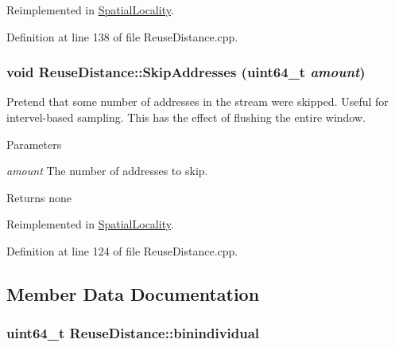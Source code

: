 Reimplemented in \hyperlink{class_spatial_locality_a72a96a67e1791851927dbf3e5ceb206f}{SpatialLocality}.



Definition at line 138 of file ReuseDistance.cpp.

\hypertarget{class_reuse_distance_a0763528236db14a9e0234465e72da3b6}{
\subsubsection[{SkipAddresses}]{\setlength{\rightskip}{0pt plus 5cm}void ReuseDistance::SkipAddresses (uint64\_\-t {\em amount})}}
\label{class_reuse_distance_a0763528236db14a9e0234465e72da3b6}
Pretend that some number of addresses in the stream were skipped. Useful for intervel-\/based sampling. This has the effect of flushing the entire window.


\begin{DoxyParams}{Parameters}
\item[{\em amount}]The number of addresses to skip.\end{DoxyParams}
\begin{DoxyReturn}{Returns}
none 
\end{DoxyReturn}


Reimplemented in \hyperlink{class_spatial_locality_acdfe7e6ac7891c4673cb7023af7227e0}{SpatialLocality}.



Definition at line 124 of file ReuseDistance.cpp.



\subsection{Member Data Documentation}
\hypertarget{class_reuse_distance_a62dae87cc1183b8bcbfa2220ddd9a3e2}{
\subsubsection[{binindividual}]{\setlength{\rightskip}{0pt plus 5cm}uint64\_\-t {\bf ReuseDistance::binindividual}}}
\label{class_reuse_distance_a62dae87cc1183b8bcbfa2220ddd9a3e2}


